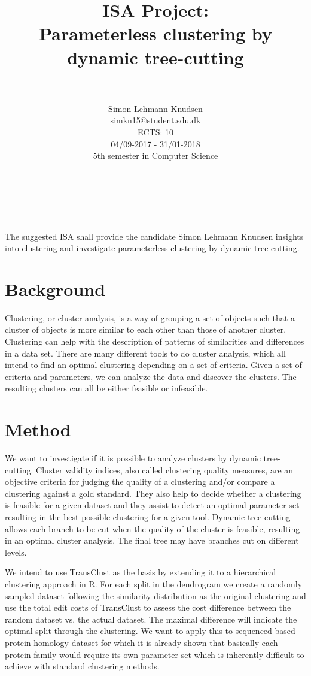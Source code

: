 \documentclass[a4paper,10pt]{article}
\title{ ISA Project: \\Parameterless clustering by dynamic tree-cutting \\ \rule{10cm}{0.5mm}}
\author{Simon Lehmann Knudsen \\
	simkn15@student.sdu.dk \\
	ECTS: 10 \\
	04/09-2017 - 31/01-2018 \\
	5th semester in Computer Science
\\\rule{5.5cm}{0.5mm}\\}
\date{}
\begin{document}
\maketitle

The suggested ISA shall provide the candidate Simon Lehmann Knudsen insights into clustering and investigate parameterless clustering by dynamic tree-cutting.

\section*{Background}
 Clustering, or cluster analysis, is a way of grouping a set of objects such that a cluster of objects is more similar to each other than those of another cluster. Clustering can help with the description of patterns of similarities and differences in a data set. There are many different tools to do cluster analysis, which all intend to find an optimal clustering depending on a set of criteria. Given a set of criteria and parameters, we can analyze the data and discover the clusters. The resulting clusters can all be either feasible or infeasible.

\section*{Method}
We want to investigate if it is possible to analyze clusters by dynamic tree-cutting. Cluster validity indices, also called clustering quality measures, are an objective criteria for judging the quality of a clustering and/or compare a clustering against a gold standard. They also help to decide whether a clustering is feasible for a given dataset and they assist to detect an optimal parameter set resulting in the best possible clustering for a given tool. Dynamic tree-cutting allows each branch to be cut when the quality of the cluster is feasible, resulting in an optimal cluster analysis. The final tree may have branches cut on different levels.

We intend to use TransClust as the basis by extending it to a hierarchical clustering approach in R. For each split in the dendrogram we create a randomly sampled dataset following the similarity distribution as the original clustering and use the total edit costs of TransClust to assess the cost difference between the random dataset vs. the actual dataset. The maximal difference will indicate the optimal split through the clustering. We want to apply this to sequenced based protein homology dataset for which it is already shown that basically each protein family would require its own parameter set which is inherently difficult to achieve with standard clustering methods.
\end{document}

